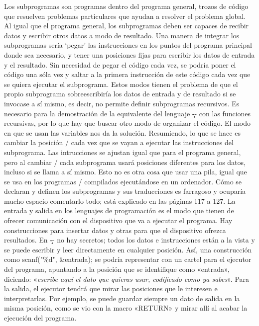 %
Los subprogramas son programas dentro del programa general, trozos de código que resuelven problemas
particulares que ayudan a resolver el problema global. Al igual que el programa general, los
subprogramas deben ser capaces de recibir datos y escribir otros datos a modo de resultado. Una
manera de integrar los subprogramas sería ‘pegar’ las instrucciones en los puntos del programa
principal donde sea necesario, y tener una posiciones fijas para escribir los datos de entrada y el
resultado. Sin necesidad de pegar el código cada vez, se podría poner el código una sóla vez y
saltar a la primera instrucción de este código cada vez que se quiera ejecutar el subprograma. Estos
modos tienen el problema de que el propio subprograma sobreescribiría los datos de entrada y de
resultado si se invocase a sí mismo, es decir, no permite definir subprogramas recursivos. Es
necesario para la demostración de la equivalente del lenguaje \c-- con las funciones recursivas, por
lo que hay que buscar otro modo de organizar el código. El modo en que se usan las variables nos da
la solución. Resumiendo, lo que se hace es cambiar la posición \top/ cada vez que se vayan a
ejecutar las instrucciones del subprograma. Las intrucciones se ajustan igual que para el programa
ge\-ne\-ral, pero al cambiar \top/ cada subprograma usará posiciones diferentes para los datos, incluso
si se llama a sí mismo. Esto no es otra cosa que usar una pila, igual que se usa en los
programas \C/ compilados ejecutándose en un ordenador. Cómo se declaran y definen los subprogramas y
sus traducciones es farragoso y ocuparía mucho espacio comentarlo todo; está explicado en las
páginas 117 a 127.
\vskip3pt\vskip0pt
% 
La entrada y salida en los lenguajes de programación es el modo que tienen de ofrecer comunicación
con el dispositivo que va a ejecutar el programa. Hay cons\-truc\-ciones para insertar datos y otras
para que el dispositivo ofrezca resultados. En \c-- no hay secretos; todos los datos e instrucciones
están a la vista y se puede escribir y leer directamente en cualquier posición. Así, una
construcción como
\encaje
\fcode scanf("\%d", \&entrada);
\finencaje
se podría representar con un cartel para el ejecutor del programa, apuntando a la posición que se
identifique como «{\fcode entrada}», diciendo: «{\it escribe aquí el dato que quieras usar,
codificado como ya sabes}». Para la salida, el ejecutor tendrá que mirar las posiciones que le
interesen e interpretarlas. Por ejemplo, se puede guardar siempre un dato de salida en la misma
posición, como se vio con la macro «{\fcode RETURN}» y mirar allí al acabar la ejecución del
programa.
